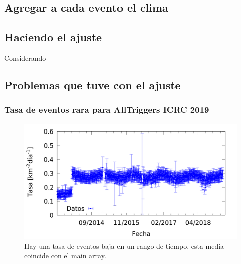 	\subsection{Agregar a cada evento el clima}

	\subsection{Haciendo el ajuste}


	Considerando 


	\subsection{Problemas que tuve con el ajuste}

	\subsubsection{Tasa de eventos rara para AllTriggers ICRC 2019}
	\begin{figure}[htbp]
		\centering
		\includegraphics[width=\textwidth]{../Apendice/draft_s38_1EeV_weather_for_reconstruction.png}
		\caption{Hay una tasa de eventos baja en un rango de tiempo, esta media coincide con el main array.}
		\label{fig:tasarara}
	\end{figure}